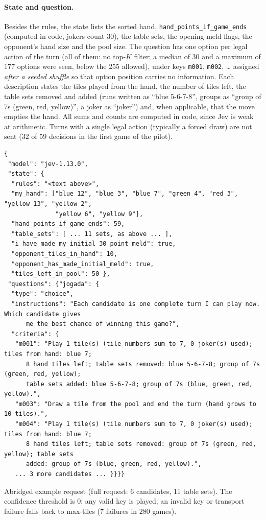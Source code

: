 \paragraph{State and question.} Besides the rules, the state lists the sorted hand, \texttt{hand\_points\_if\allowbreak\_game\_ends} (computed in code, jokers count 30), the table sets, the opening-meld flags, the opponent's hand size and the pool size. The question has one option per legal action of the turn (all of them: no top-$K$ filter; a median of $30$ and a maximum of $177$ options were seen, below the $255$ allowed), under keys \texttt{m001}, \texttt{m002}, \dots{} assigned \emph{after a seeded shuffle} so that option position carries no information. Each description states the tiles played from the hand, the number of tiles left, the table sets removed and added (runs written as ``blue 5-6-7-8'', groups as ``group of 7s (green, red, yellow)'', a joker as ``joker'') and, when applicable, that the move empties the hand. All sums and counts are computed in code, since Jev is weak at arithmetic. Turns with a single legal action (typically a forced draw) are not sent ($32$ of $59$ decisions in the first game of the pilot).
{\scriptsize\begin{verbatim}
{
 "model": "jev-1.13.0",
 "state": {
  "rules": "<text above>",
  "my_hand": ["blue 12", "blue 3", "blue 7", "green 4", "red 3", "yellow 13", "yellow 2",
              "yellow 6", "yellow 9"],
  "hand_points_if_game_ends": 59,
  "table_sets": [ ... 11 sets, as above ... ],
  "i_have_made_my_initial_30_point_meld": true,
  "opponent_tiles_in_hand": 10,
  "opponent_has_made_initial_meld": true,
  "tiles_left_in_pool": 50 },
 "questions": {"jogada": {
  "type": "choice",
  "instructions": "Each candidate is one complete turn I can play now. Which candidate gives
      me the best chance of winning this game?",
  "criteria": {
   "m001": "Play 1 tile(s) (tile numbers sum to 7, 0 joker(s) used); tiles from hand: blue 7;
      8 hand tiles left; table sets removed: blue 5-6-7-8; group of 7s (green, red, yellow);
      table sets added: blue 5-6-7-8; group of 7s (blue, green, red, yellow).",
   "m003": "Draw a tile from the pool and end the turn (hand grows to 10 tiles).",
   "m004": "Play 1 tile(s) (tile numbers sum to 7, 0 joker(s) used); tiles from hand: blue 7;
      8 hand tiles left; table sets removed: group of 7s (green, red, yellow); table sets
      added: group of 7s (blue, green, red, yellow).",
   ... 3 more candidates ... }}}}
\end{verbatim}}
\noindent Abridged example request (full request: 6 candidates, 11 table sets). The confidence threshold is $0$: any valid key is played; an invalid key or transport failure falls back to max-tiles ($7$ failures in $280$ games).

